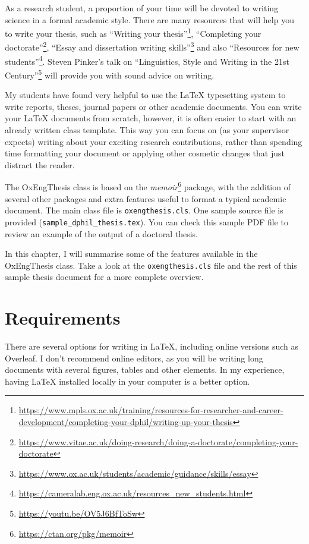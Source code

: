 As a research student, a proportion of your time will be devoted to writing science in a formal academic style. There are many resources that will help you to write your thesis, such as ``Writing your thesis''\footnote{\url{https://www.mpls.ox.ac.uk/training/resources-for-researcher-and-career-development/completing-your-dphil/writing-up-your-thesis}}, ``Completing your doctorate''\footnote{\url{https://www.vitae.ac.uk/doing-research/doing-a-doctorate/completing-your-doctorate}}, ``Essay and dissertation writing skills''\footnote{\url{https://www.ox.ac.uk/students/academic/guidance/skills/essay}} and also ``Resources for new students''\footnote{\url{https://cameralab.eng.ox.ac.uk/resources_new_students.html}}. Steven Pinker's talk on ``Linguistics, Style and Writing in the 21st Century''\footnote{\url{https://youtu.be/OV5J6BfToSw}} will provide you with sound advice on writing. 

My students have found very helpful to use the LaTeX typesetting system to write reports, theses, journal papers or other academic documents. You can write your LaTeX documents from scratch, however, it is often easier to start with an already written class template. This way you can focus on (as your supervisor expects) writing about your exciting research contributions, rather than spending time formatting your document or applying other cosmetic changes that just distract the reader. 

The OxEngThesis class is based on the \textit{memoir}\footnote{\url{https://ctan.org/pkg/memoir}} package, with the addition of several other packages and extra features useful to format a typical academic document. The main class file is \verb|oxengthesis.cls|. One sample source file is provided (\verb|sample_dphil_thesis.tex|). You can check this sample
PDF file to review an example of the output of a doctoral thesis.

In this chapter, I will summarise some of the features available in the OxEngThesis class. Take a look at the \verb|oxengthesis.cls| file and the rest of this sample thesis document for a more complete overview.


\section{Requirements}


There are several options for writing in LaTeX, including online versions such as Overleaf. I don't recommend online editors, as you will be writing long documents with several figures, tables and other elements. In my experience, having LaTeX installed locally in your computer is a better option.

